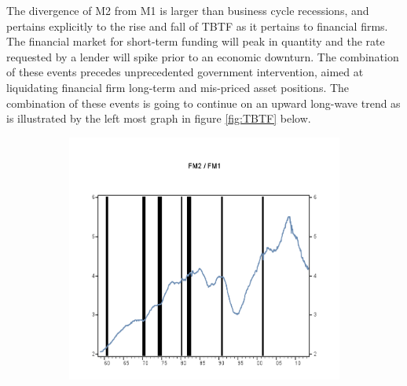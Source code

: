 
The divergence of M2 from M1 is larger than business cycle recessions, and pertains explicitly to the rise and fall of TBTF as it pertains to financial firms.  The financial market for short-term funding will peak in quantity and the rate requested by a lender will spike prior to an economic downturn.  The combination of these events precedes unprecedented government intervention, aimed at liquidating financial firm long-term and mis-priced asset positions.  The combination of these events is going to continue on an upward long-wave trend as is illustrated by the left most graph in figure \ref{fig:TBTF} below.

\begin{figure}[H]
\centering
\begin{subfigure}{.35\textwidth}
  \centering
  \includegraphics[width=1\linewidth]{figure/HistoricalFM.png}
  \caption*{}
  \label{fig:corp}
\end{subfigure}%
\centering
\begin{subfigure}{.30\textwidth}
  \centering

\end{subfigure}
\end{figure}
